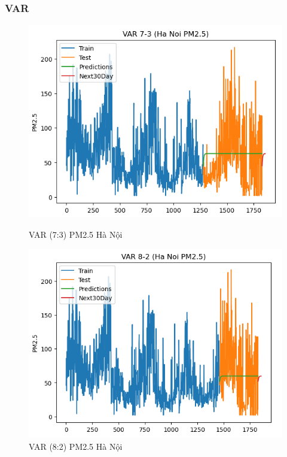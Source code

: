 \subsubsection{VAR}
\begin{figure}[h]
    \centering
    \begin{minipage}[b]{0.45\linewidth}
        \centering
        \includegraphics[width=\linewidth]{img/VAR_7_3_HN.png}
        \caption{\scriptsize VAR (7:3) PM2.5 Hà Nội}
        \label{fig1}
    \end{minipage}\hfill
    \begin{minipage}[b]{0.45\linewidth}
        \centering
        \includegraphics[width=\linewidth]{img/VAR_8_2_HN.png}
        \caption{\scriptsize VAR (8:2) PM2.5 Hà Nội}

\end{minipage}
\end{figure}

